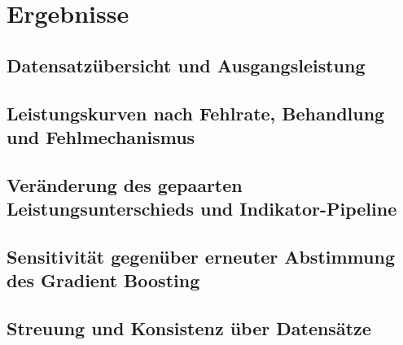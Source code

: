 \section{Ergebnisse}\label{sec:ergebnisse}

\subsection{Datensatzübersicht und Ausgangsleistung}\label{sec:ergebnisse-referenz}

\subsection{Leistungskurven nach Fehlrate, Behandlung und Fehlmechanismus}\label{sec:ergebnisse-kurven}

\subsection{Veränderung des gepaarten Leistungsunterschieds und Indikator-Pipeline}\label{sec:ergebnisse-abstand}

\subsection{Sensitivität gegenüber erneuter Abstimmung des Gradient Boosting}\label{sec:ergebnisse-tuning}

\subsection{Streuung und Konsistenz über Datensätze}\label{sec:ergebnisse-streuung}
